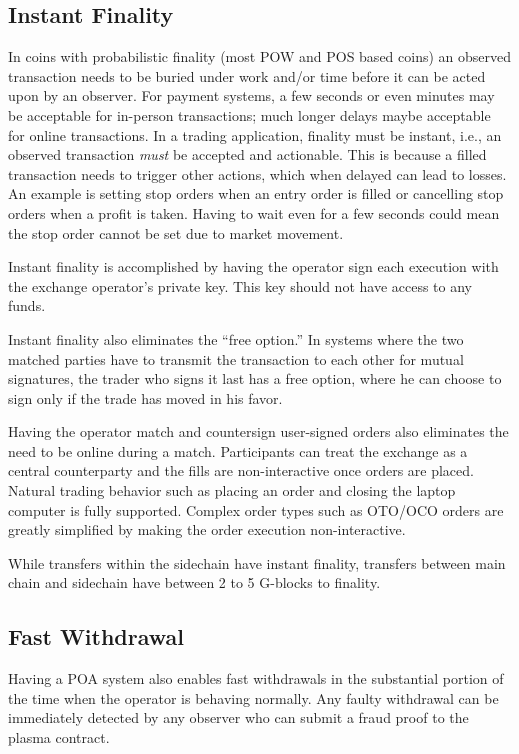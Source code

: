 \documentclass[12pt,a4paper]{article}
\begin{document}
\subsection{Instant Finality}
In coins with probabilistic finality (most POW and POS based coins) an observed transaction needs to be buried under work and/or time before it can be acted upon by an observer. For payment systems, a few seconds or even minutes may be acceptable for in-person transactions; much longer delays maybe acceptable for online transactions. In a trading application, finality must be instant, i.e., an observed transaction \emph{must} be accepted and actionable. This is because a filled transaction needs to trigger other actions, which when delayed can lead to losses. An example is setting stop orders when an entry order is filled or cancelling stop orders when a profit is taken. Having to wait even for a few seconds could mean the stop order cannot be set due to market movement.

Instant finality is accomplished by having the operator sign each execution with the exchange operator’s private key. This key should not have access to any funds. 

Instant finality also eliminates the “free option.” In systems where the two matched parties have to transmit the transaction to each other for mutual signatures, the trader who signs it last has a free option, where he can choose to sign only if the trade has moved in his favor. 

Having the operator match and countersign user-signed orders also eliminates the need to be online during a match. Participants can treat the exchange as a central counterparty and the fills are non-interactive once orders are placed. Natural trading behavior such as placing an order and closing the laptop computer is fully supported. Complex order types such as OTO/OCO orders\cite{invOT} are greatly simplified by making the order execution non-interactive.

While transfers within the sidechain have instant finality, transfers between main chain and sidechain have between 2 to 5 G-blocks to finality.

\subsection{Fast Withdrawal}
Having a POA system also enables fast withdrawals in the substantial portion of the time when the operator is behaving normally. Any faulty withdrawal can be immediately detected by any observer who can submit a fraud proof to the plasma contract.
\end{document}
